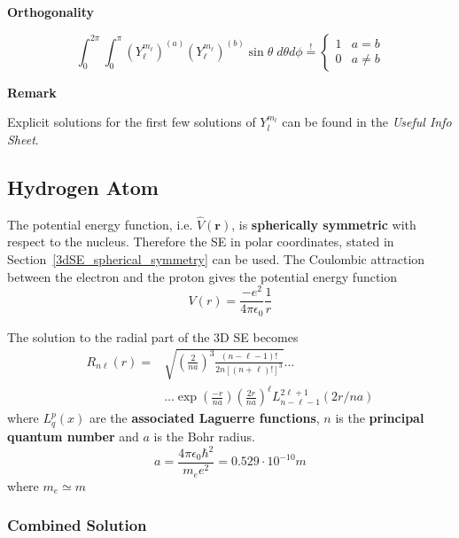 \textbf{Orthogonality}

\noindent\begin{equation*}
    \int_0^{2\pi}\int_0^{\pi} {(Y_\ell^{m_\ell})}^{(a)}{(Y_\ell^{m_\ell})}^{(b)} \sin\theta\;d\theta d\phi \overset{!}{=} \begin{cases}
        1 & a=b     \\
        0 & a\neq b
    \end{cases}
\end{equation*}

\textbf{Remark}

Explicit solutions for the first few solutions of $Y_l^{m_l}$ can be found in the \textit{Useful Info Sheet}.

\subsection{Hydrogen Atom}\label{H-atom}
The potential energy function, i.e. $\widehat{V}(\mathbf{r})$, is \textbf{spherically symmetric} with respect to the nucleus. Therefore the SE in polar coordinates, stated in Section~\ref{3dSE_spherical_symmetry} can be used.
\newpar{}
The Coulombic attraction between the electron and the proton gives the potential energy function
\begin{equation*}
    V(r) = \frac{-e^2}{4\pi\epsilon_0}\frac{1}{r}
\end{equation*}


The solution to the radial part of the 3D SE becomes
\begin{align*}
    R_{n\ell}(r) = & \sqrt{{\left(\frac{2}{na}\right)}^3\frac{(n-\ell-1)!}{2n{[(n+\ell)!]}^3}} \ldots                    \\
                   & \ldots\exp\left(\frac{-r}{na}\right){\left(\frac{2r}{na}\right)}^\ell L_{n-\ell-1}^{2\ell+1}(2r/na)
\end{align*}
where $L_q^p (x)$ are the \textbf{associated Laguerre functions}, $n$ is the \textbf{principal quantum number} and $a$ is the Bohr radius.
\begin{equation*}
    a = \frac{4\pi\epsilon_0\hbar^2}{m_e e^2}=0.529 \cdot 10^{-10}m
\end{equation*}
where $m_e\simeq m$

\subsubsection{Combined Solution}


